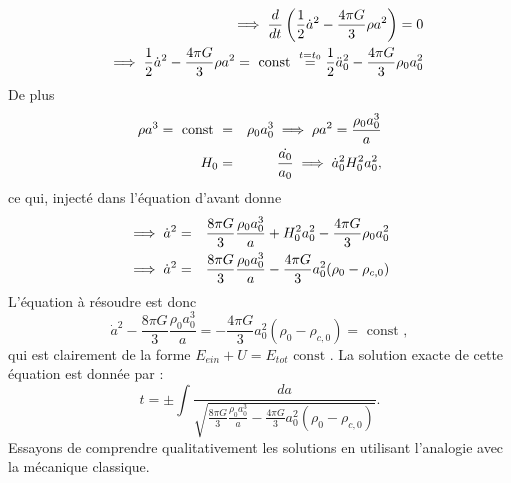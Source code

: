 \documentclass[a4paper,12pt]{report}
\theoremstyle{plain}
\theoremstyle{plain}
\begin{document}
 \begin{eqnarray}
 && \implies \frac{d}{dt} \left( \frac{1}{2} \dot{a}^2 - \frac{4 \pi G}{3} \rho a^2 \right)=0 \cr
 & &\implies \frac{1}{2} \dot{a}^2 - \frac{4\pi G}{3} \rho a^2 = \text{ const } \overset{t=t_0}{=} \frac{1}{2} \ddot{a}_0^2 - \frac{4 \pi G}{3} \rho_0 a_0^2  
 \end{eqnarray}
 De plus 
 \begin{eqnarray}
 \rho a^3 = \text{ const } &= &\rho_0 a_0^3 \implies \rho a^2 = \frac{\rho_0 a_0^3}{a} \cr
  H_0& =& \frac{\dot{a_0}}{a_0} \implies \dot{a}_0^2 H_0^2a_0^2,
 \end{eqnarray} 
 ce qui, inject\'e dans l'\'equation d'avant donne 
 \begin{eqnarray}
 \implies \dot{a}^2 &=& \frac{ 8 \pi G}{3} \frac{\rho_0 a_0^3}{a} + H_0^2 a_0^2 - \frac{ 4 \pi G }{3} \rho_0 a_0^2 \cr
 \implies \dot{a}^2 &=& \frac{8 \pi G }{3} \frac{\rho_0 a_0^3}{a} -  \frac{4 \pi G}{3} a_0^2 (\rho_0 -\rho_{c,0}) 
 \end{eqnarray}
 L'\'equation \`a r\'esoudre est donc 
 \begin{equation}
 \dot{a}^2 - \frac{8\pi G }{3} \frac{\rho_0 a_0^3}{a} =
 - \frac{4 \pi G}{3} a_0^2 (\rho_0 - \rho_{c,0})= \text{ const },
 \end{equation} 
 qui est clairement de la forme $E_{ein} +U =E_{tot} \text{ const } $. La solution exacte de cette \'equation est donn\'ee par : 
 \begin{equation}
 t =\pm  \displaystyle \int \frac{da}{\sqrt{\frac{ 8 \pi G}{3} \frac{\rho_0 a_0^3}{a} -
 \frac{4 \pi G }{3} a_0^2 (\rho_0 -\rho_{c,0})}}.
 \end{equation}
 Essayons de comprendre qualitativement les solutions en utilisant l'analogie avec la m\'ecanique classique. 
 
\end{document}
